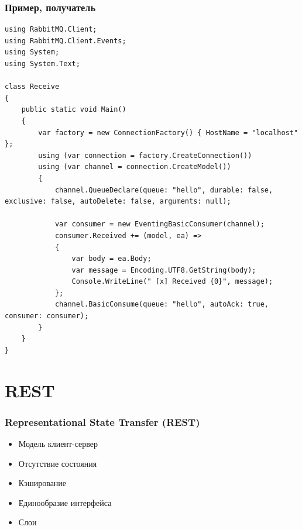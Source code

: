 \documentclass[xetex,mathserif,serif]{beamer}
\begin{document}
	\begin{frame}[fragile]
		\frametitle{Пример, получатель}
		\begin{ssmall}
			\begin{verbatim}
using RabbitMQ.Client;
using RabbitMQ.Client.Events;
using System;
using System.Text;

class Receive
{
    public static void Main()
    {
        var factory = new ConnectionFactory() { HostName = "localhost" };
        using (var connection = factory.CreateConnection())
        using (var channel = connection.CreateModel())
        {
            channel.QueueDeclare(queue: "hello", durable: false, exclusive: false, autoDelete: false, arguments: null);

            var consumer = new EventingBasicConsumer(channel);
            consumer.Received += (model, ea) =>
            {
                var body = ea.Body;
                var message = Encoding.UTF8.GetString(body);
                Console.WriteLine(" [x] Received {0}", message);
            };
            channel.BasicConsume(queue: "hello", autoAck: true, consumer: consumer);
        }
    }
}
			\end{verbatim}
		\end{ssmall}
	\end{frame}

	\section{REST}

	\begin{frame}
		\frametitle{Representational State Transfer (REST)}
		\begin{itemize}
			\item Модель клиент-сервер
			\item Отсутствие состояния
			\item Кэширование
			\item Единообразие интерфейса
			\item Слои
		\end{itemize}
	\end{frame}
\end{document}
